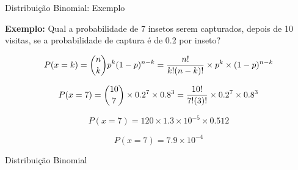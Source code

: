 \documentclass{beamer}\usepackage[]{graphicx}\usepackage[]{color}
\begin{document}
\begin{frame}{Distribuição Binomial: Exemplo}

\begin{small}
\alert{\textbf{Exemplo:}} Qual a probabilidade de 7 insetos serem capturados, depois de 10 visitas, se a probabilidade de captura é de 0.2 por inseto?

\begin{equation*}
  P(x=k) =\binom{n}{k} p^k(1-p)^{n-k} = {n! \over k!(n-k)!} \times p^k \times (1-p)^{n-k}
\end{equation*}
  
\begin{equation*}
  P(x=7) =\binom{10}{7} \times 0.2^7 \times 0.8^3 = {10! \over 7!(3)!} \times 0.2^7 \times 0.8^3
\end{equation*}
  
\begin{equation*}
  P(x=7) =120 \times \ensuremath{1.3\times 10^{-5}} \times 0.512
\end{equation*}

\end{small}

\begin{equation*}
  P(x=7) =\ensuremath{7.9\times 10^{-4}}
\end{equation*}


\end{frame} 

\begin{frame}{Distribuição Binomial}




\end{frame} 
\end{document}
